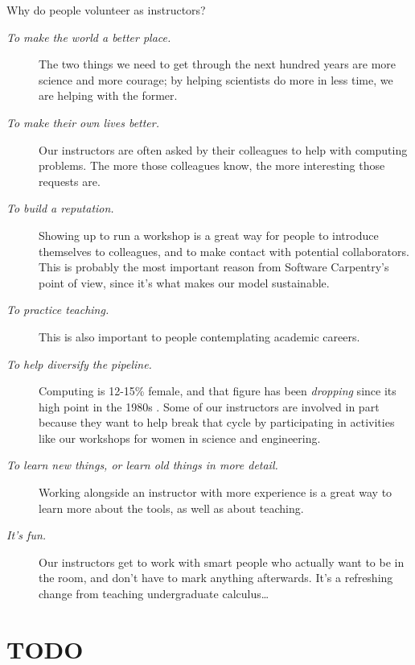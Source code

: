 \documentclass[10pt,a4paper,twocolumn]{article}
\begin{document}
Why do people volunteer as instructors?

\begin{description}

\item[\emph{To make the world a better place.}]  The two things we
  need to get through the next hundred years are more science and more
  courage; by helping scientists do more in less time, we are helping
  with the former.

\item[\emph{To make their own lives better.}]  Our instructors are
  often asked by their colleagues to help with computing problems.
  The more those colleagues know, the more interesting those requests
  are.

\item[\emph{To build a reputation.}]  Showing up to run a workshop is
  a great way for people to introduce themselves to colleagues, and to
  make contact with potential collaborators. This is probably the most
  important reason from Software Carpentry's point of view, since it's
  what makes our model sustainable.

\item[\emph{To practice teaching.}]
  This is also important to people contemplating academic careers.
 
\item[\emph{To help diversify the pipeline.}]  Computing is 12-15\%
  female, and that figure has been \emph{dropping} since its high
  point in the 1980s \cite{wic}. Some of our instructors are
  involved in part because they want to help break that cycle by
  participating in activities like our workshops for women in science
  and engineering.

\item[\emph{To learn new things, or learn old things in more detail.}]
  Working alongside an instructor with more experience is a great way
  to learn more about the tools, as well as about teaching.

\item[\emph{It's fun.}]  Our instructors get to work with smart people
  who actually want to be in the room, and don't have to mark anything
  afterwards. It's a refreshing change from teaching undergraduate
  calculus\ldots{}

\end{description}

\section*{TODO}
\end{document}
